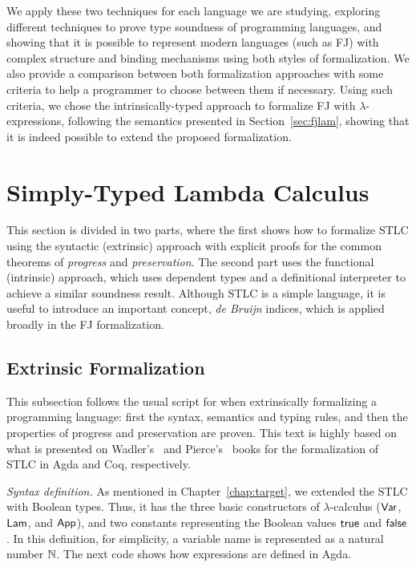 \documentclass[tese,capa,english]{texufpel}
\newcommand{\D}[1]{\blue{\mathsf{#1}}}
\newcommand{\Con}[1]{\green{\mathsf{#1}}}
\newcommand{\HC}[1]{\green{\mathsf{#1}}}
\begin{document}
We apply these two techniques for each language we are studying, exploring different techniques to prove type soundness of programming languages, and showing that it is possible to represent modern languages (such as FJ) with complex structure and binding mechanisms using both styles of formalization. We also provide a comparison between both formalization approaches with some criteria to help a programmer to choose between them if necessary. Using such criteria, we chose the intrinsically-typed approach to formalize FJ with $\lambda$-expressions, following the semantics presented in Section~\ref{sec:fjlam}, showing that it is indeed possible to extend the proposed formalization.

\section{Simply-Typed Lambda Calculus}

This section is divided in two parts, where the first shows how to formalize STLC using the syntactic (extrinsic) approach with explicit proofs for the common theorems of \emph{progress} and \emph{preservation}. The second part uses the functional (intrinsic) approach, which uses dependent types and a definitional interpreter to achieve a similar soundness result. Although STLC is a simple language, it is useful to introduce an important concept, \emph{de Bruijn} indices, which is applied broadly in the FJ formalization.

\subsection{Extrinsic Formalization}

This subsection follows the usual script for when extrinsically formalizing a programming language: first the syntax, semantics and typing rules, and then the properties of progress and preservation are proven. This text is highly based on what is presented on Wadler's~\cite{Wadler-plfa} and Pierce's~\cite{pierce2019software} books for the formalization of STLC in Agda and Coq, respectively.

\vspace{8pt}
\noindent\emph{Syntax definition.} As mentioned in Chapter~\ref{chap:target}, we extended the STLC with Boolean types. Thus, it has the three basic constructors of $\lambda$-calculus (\ensuremath{\HC{Var}}, \ensuremath{\HC{Lam}}, and \ensuremath{\HC{App}}), and two constants representing the Boolean values \ensuremath{\Con{true}} and \ensuremath{\Con{false}}. In this definition, for simplicity, a variable name is represented as a natural number \ensuremath{\D{\mathbb{N}}}. The next code shows how expressions are defined in Agda.
\end{document}

